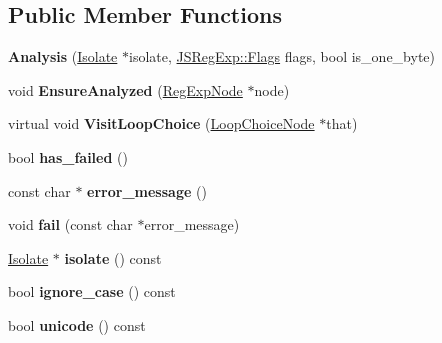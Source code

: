 \subsection*{Public Member Functions}
\begin{DoxyCompactItemize}
\item 
{\bfseries Analysis} (\hyperlink{classv8_1_1internal_1_1_isolate}{Isolate} $\ast$isolate, \hyperlink{classv8_1_1base_1_1_flags}{J\+S\+Reg\+Exp\+::\+Flags} flags, bool is\+\_\+one\+\_\+byte)\hypertarget{classv8_1_1internal_1_1_analysis_ad580622ff0451870580c586d710e7c0c}{}\label{classv8_1_1internal_1_1_analysis_ad580622ff0451870580c586d710e7c0c}

\item 
void {\bfseries Ensure\+Analyzed} (\hyperlink{classv8_1_1internal_1_1_reg_exp_node}{Reg\+Exp\+Node} $\ast$node)\hypertarget{classv8_1_1internal_1_1_analysis_a91ea9ab34a0b720e4ba0414997e6f978}{}\label{classv8_1_1internal_1_1_analysis_a91ea9ab34a0b720e4ba0414997e6f978}

\item 
virtual void {\bfseries Visit\+Loop\+Choice} (\hyperlink{classv8_1_1internal_1_1_loop_choice_node}{Loop\+Choice\+Node} $\ast$that)\hypertarget{classv8_1_1internal_1_1_analysis_aa6a0b113e9b8a9268a3af41dbdc24ff6}{}\label{classv8_1_1internal_1_1_analysis_aa6a0b113e9b8a9268a3af41dbdc24ff6}

\item 
bool {\bfseries has\+\_\+failed} ()\hypertarget{classv8_1_1internal_1_1_analysis_a49fb801db5532a96bc0c078e3c928910}{}\label{classv8_1_1internal_1_1_analysis_a49fb801db5532a96bc0c078e3c928910}

\item 
const char $\ast$ {\bfseries error\+\_\+message} ()\hypertarget{classv8_1_1internal_1_1_analysis_a70729ef89c68f6ba50909873d438fe47}{}\label{classv8_1_1internal_1_1_analysis_a70729ef89c68f6ba50909873d438fe47}

\item 
void {\bfseries fail} (const char $\ast$error\+\_\+message)\hypertarget{classv8_1_1internal_1_1_analysis_ae430a167d7e2e6cf98834465c537a64e}{}\label{classv8_1_1internal_1_1_analysis_ae430a167d7e2e6cf98834465c537a64e}

\item 
\hyperlink{classv8_1_1internal_1_1_isolate}{Isolate} $\ast$ {\bfseries isolate} () const \hypertarget{classv8_1_1internal_1_1_analysis_af2055729bffb64459d1129ec5135fdef}{}\label{classv8_1_1internal_1_1_analysis_af2055729bffb64459d1129ec5135fdef}

\item 
bool {\bfseries ignore\+\_\+case} () const \hypertarget{classv8_1_1internal_1_1_analysis_a21a59737aea76ed146fdce63faaabdd8}{}\label{classv8_1_1internal_1_1_analysis_a21a59737aea76ed146fdce63faaabdd8}

\item 
bool {\bfseries unicode} () const \hypertarget{classv8_1_1internal_1_1_analysis_ad4692b73a5071229c9a5641b2f077150}{}\label{classv8_1_1internal_1_1_analysis_ad4692b73a5071229c9a5641b2f077150}

\end{DoxyCompactItemize}
